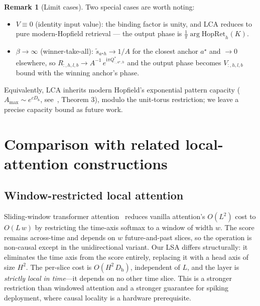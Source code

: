 \documentclass[11pt]{article}
\newcommand{\im}{\mathrm{i}}
\newcommand{\nh}{H}              %
\newcommand{\Dh}{D_{\mathrm{h}}} %
\theoremstyle{definition}
\newtheorem{remark}{Remark}
\begin{document}
\begin{remark}[Limit cases]\label{rem:lca-hopfield-limits}
Two special cases are worth noting:
\begin{itemize}[nosep,leftmargin=*]
  \item $V \equiv 0$ (identity input value): the binding factor is
        unity, and LCA reduces to pure modern-Hopfield retrieval ---
        the output phase is $\tfrac{1}{\pi}\arg \mathrm{HopRet}_h(K)$.
  \item $\beta\to\infty$ (winner-take-all): $\tilde s_{a^{\star} h}\to 1/A$
        for the closest anchor $a^{\star}$ and $\to 0$ elsewhere, so
        $R_{:,h,l,b} \to A^{-1}\,e^{\im\pi Q^{*}_{:,a^{\star}, h}}$
        and the output phase becomes $V_{:,h,l,b}$ bound with the
        winning anchor's phase.
\end{itemize}
\end{remark}

Equivalently, LCA inherits modern Hopfield's exponential pattern
capacity ($A_{\max}\sim e^{c\Dh}$, see~\cite{hopfield-is-all-you-need},
Theorem 3), modulo the unit-torus restriction; we leave a precise
capacity bound as future work.

\section{Comparison with related local-attention constructions}
\label{sec:related}

\subsection{Window-restricted local attention}

Sliding-window transformer attention~\cite{longformer,longformer-followups}
reduces vanilla attention's $O(L^2)$ cost to $O(L\,w)$ by restricting
the time-axis softmax to a window of width $w$. The score
remains across-time and depends on $w$ future-and-past slices, so the
operation is non-causal except in the unidirectional variant. Our LSA
differs structurally: it eliminates the time axis from the score
entirely, replacing it with a head axis of size $\nh^2$. The per-slice
cost is $O(\nh^2\,\Dh)$, independent of $L$, and the layer is
\emph{strictly local in time}---it depends on no other time slice.
This is a stronger restriction than windowed attention and a stronger
guarantee for spiking deployment, where causal locality is a hardware
prerequisite.
\end{document}
